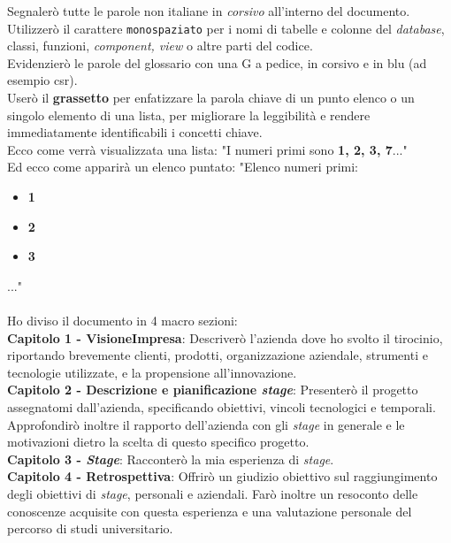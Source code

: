 Segnalerò tutte le parole non italiane in \textit{corsivo} all'interno del documento.\\
Utilizzerò il carattere \texttt{monospaziato} per i nomi di tabelle e colonne del \textit{database}, 
classi, funzioni, \textit{component, view} o altre parti del codice.\\
Evidenzierò le parole del glossario con una G a pedice, in corsivo e in blu (ad esempio \gls{csr}).\\
Userò il \textbf{grassetto} per enfatizzare la parola chiave di un punto elenco o un singolo elemento di una lista,
per migliorare la leggibilità e rendere immediatamente identificabili i concetti chiave.\\
Ecco come verrà visualizzata una lista:
"I numeri primi sono \textbf{1, 2, 3, 7}..."\\
Ed ecco come apparirà un elenco puntato:
"Elenco numeri primi:
\begin{itemize}
\item \textbf{1}
\item \textbf{2}
\item \textbf{3}
\end{itemize}
..."\\\\
Ho diviso il documento in 4 macro sezioni:\\
\textbf{Capitolo 1 - VisioneImpresa}: Descriverò l'azienda dove ho svolto il tirocinio, riportando brevemente clienti, 
prodotti, organizzazione aziendale, strumenti e tecnologie utilizzate, e la propensione all'innovazione.\\
\textbf{Capitolo 2 - Descrizione e pianificazione \textit{stage}}: Presenterò il progetto assegnatomi dall'azienda, specificando 
obiettivi, vincoli tecnologici e temporali. Approfondirò inoltre il rapporto dell'azienda con gli \textit{stage} in generale e 
le motivazioni dietro la scelta di questo specifico progetto.\\
\textbf{Capitolo 3 - \textit{Stage}}: Racconterò la mia esperienza di \textit{stage}.\\
\textbf{Capitolo 4 - Retrospettiva}: Offrirò un giudizio obiettivo sul raggiungimento degli obiettivi di \textit{stage}, 
personali e aziendali. Farò inoltre un resoconto delle conoscenze acquisite con questa esperienza e una valutazione 
personale del percorso di studi universitario.

\endgroup
\vfill
